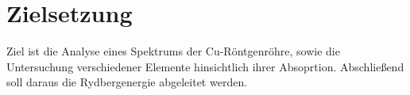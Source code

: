 \section{Zielsetzung}
\label{sec:Zielsetzung}


Ziel ist die Analyse eines Spektrums der Cu-Röntgenröhre, sowie die Untersuchung verschiedener Elemente hinsichtlich ihrer Absoprtion.
Abschließend soll daraus die Rydbergenergie abgeleitet werden. 
